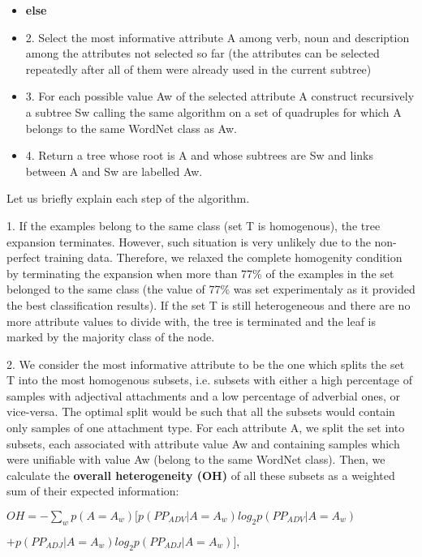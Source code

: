 \begin{itemize}
\item[]
  {\bf else}

\item[]
  2. Select the most informative attribute A among verb, noun and         description among the attributes not selected so far (the attributes can be     selected repeatedly after all of them were already used in the current  subtree)

\item[]
  3. For each possible value Aw of the selected attribute A construct     recursively a subtree Sw calling the same algorithm on a set of         quadruples for which A belongs to the same WordNet class as Aw.

\item[]
  4. Return a tree whose root is A and whose subtrees are Sw and links
  between A and Sw are labelled Aw.
\end{itemize}


\noindent
Let us briefly explain each step of the algorithm.

1. If the examples belong to the same class (set T is homogenous), the tree expansion terminates. However, such situation is very unlikely due to the non-perfect training data. Therefore, we relaxed the complete homogenity condition by terminating the expansion when more than 77\% of the examples in the set belonged to the same class (the value of 77\% was set experimentaly as it provided the best classification results). If the set T is still heterogeneous and there are no more attribute values to divide with, the tree is terminated and the leaf is marked by the majority class of the node. 

2. We consider the most informative attribute to be the one which splits the set T into the most homogenous subsets, i.e. subsets with either a high percentage of samples with adjectival attachments and a low percentage of adverbial ones, or vice-versa. The optimal split would be such that all the subsets would contain only samples of one attachment type. For each attribute A, we split the set into subsets, each associated with attribute value Aw and containing samples which were unifiable with value Aw (belong to the same WordNet class). Then, we calculate the {\bf overall heterogeneity (OH)} of all these subsets as a weighted sum of their expected information:

\begin{center}
$OH=-{\displaystyle \sum_{w}}p(A=A_{w})[p(PP_{ADV}|A=A_{w})log_{2}p(PP_{ADV}|A=A_{w})$

$+p(PP_{ADJ}|A=A_{w})log_{2}p(PP_{ADJ}|A=A_{w})],$
\end{center}

